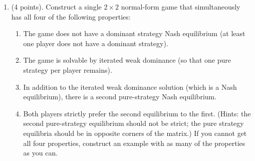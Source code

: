 \documentclass[11pt]{article}
\begin{document}
\begin{enumerate}
\begin{enumerate}
\item (4 points). Construct a single $2 \times 2$ normal-form game that simultaneously
has all four of the following properties:
\begin{enumerate}
\item The game does not have a dominant strategy Nash equilibrium (at least one player does not have a dominant strategy).
\item The game is solvable by iterated weak dominance (so that one pure strategy per player remains).
\item In addition to the iterated weak dominance solution (which is a Nash
equilibrium), there is a second pure-strategy Nash equilibrium.
\item Both players strictly prefer the second equilibrium to the first.
(Hints: the second pure-strategy equilibrium should not be strict; the pure strategy equilibria should be in opposite corners of the matrix.) If you cannot get all four properties, construct an example with as many of the properties as you can.
\end{enumerate}

\end{enumerate}
\end{enumerate}
\end{document}
